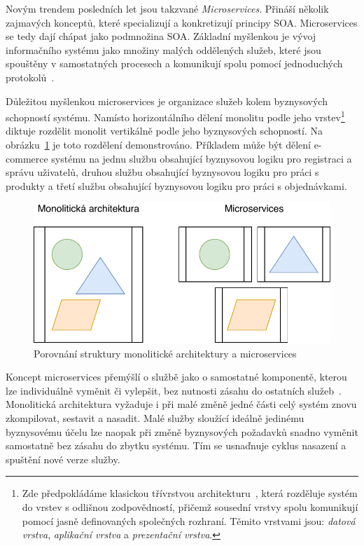 Novým trendem posledních let jsou takzvané \textit{Microservices}.
Přináší několik zajmavých konceptů, které specializují a konkretizují
principy SOA. Microservices se tedy dají chápat jako podmnožina
SOA. Základní myšlenkou je vývoj informačního systému jako množiny
malých oddělených služeb, které jsou spouštěny v samostatných procesech
a komunikují spolu pomocí jednoduchých protokolů~\cite{lewis2014microservices}.

Důležitou myšlenkou microservices je organizace služeb kolem
byznysových schopností systému. Namísto horizontálního dělení monolitu
podle jeho vrstev\footnote{
Zde předpokládáme klasickou třívrstvou architekturu~\cite{fowler2002patterns},
která rozděluje systém do vrstev s odlišnou zodpovědností,
přičemž sousední vrstvy spolu komunikují pomocí jasně definovaných společných rozhraní.
Těmito vrstvami jsou: \textit{datová vrstva}, \textit{aplikační vrstva} a \textit{prezentační vrstva}.
} diktuje rozdělit monolit vertikálně podle jeho byznysových schopností.
Na obrázku~\ref{fig:monolith-vs-microservices} je toto rozdělení demonstrováno.
Příkladem může být dělení e-commerce systému na jednu službu obsahující byznysovou
logiku pro registraci a správu uživatelů, druhou službu obsahující byznysovou logiku
pro práci s produkty a třetí službu obsahující byznysovou logiku pro práci
s objednávkami.

\begin{figure}
    \centering
    \includegraphics[keepaspectratio=true, width=0.8\linewidth]{figures/monolith-vs-microservices.pdf}
    \caption{Porovnání struktury monolitické architektury a microservices}
    \label{fig:monolith-vs-microservices}
\end{figure}

Koncept microservices přemýšlí o službě jako o samostatné komponentě,
kterou lze individuálně vyměnit či vylepšit, bez nutnosti zásahu do
ostatních služeb~\cite{lewis2014microservices}. Monolitická architektura
vyžaduje i při malé změně jedné části celý systém znovu zkompilovat, sestavit
a nasadit. Malé služby sloužící ideálně jedinému byznysovému účelu lze naopak
při změně byznysových požadavků snadno vyměnit samostatně bez zásahu do zbytku
systému. Tím se usnaďnuje cyklus nasazení a spuštění nové verze služby.

